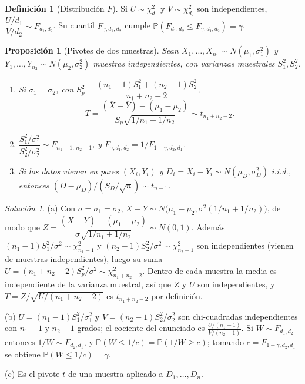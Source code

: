 \documentclass[11pt]{article}
\theoremstyle{plain}
\newtheorem{proposition}[theorem]{Proposición}
\theoremstyle{definition}
\newtheorem{definition}[theorem]{Definición}
\theoremstyle{remark}
\theoremstyle{solstyle}
\newtheorem*{solution}{Solución}
\newcommand{\Pbb}{\mathbb{P}}
\newcommand{\1}{\mathbbm{1}}
\newcommand{\Xbar}{\overline{X}}
\newcommand{\Ybar}{\overline{Y}}
\begin{document}
\begin{definition}[Distribución $F$]
Si $U\sim\chi^2_{d_1}$ y $V\sim\chi^2_{d_2}$ son independientes, $\dfrac{U/d_1}{V/d_2}\sim F_{d_1,d_2}$. Su cuantil $F_{\gamma,d_1,d_2}$ cumple $\Pbb(F_{d_1,d_2}\le F_{\gamma,d_1,d_2})=\gamma$.
\end{definition}

\begin{proposition}[Pivotes de dos muestras]\label{prop:twosample}
Sean $X_1,\dots,X_{n_1}\sim N(\mu_1,\sigma_1^2)$ y $Y_1,\dots,Y_{n_2}\sim N(\mu_2,\sigma_2^2)$ muestras independientes, con varianzas muestrales $S_1^2,S_2^2$.
\begin{enumerate}[label=(\alph*),leftmargin=2em]
\item Si $\sigma_1=\sigma_2$, con $S_p^2=\dfrac{(n_1-1)S_1^2+(n_2-1)S_2^2}{n_1+n_2-2}$,
\[
T=\frac{(\Xbar-\Ybar)-(\mu_1-\mu_2)}{S_p\sqrt{1/n_1+1/n_2}}\sim t_{n_1+n_2-2}.
\]
\item $\dfrac{S_1^2/\sigma_1^2}{S_2^2/\sigma_2^2}\sim F_{n_1-1,\,n_2-1}$, y $F_{\gamma,d_1,d_2}=1/F_{1-\gamma,d_2,d_1}$.
\item Si los datos vienen en pares $(X_i,Y_i)$ y $D_i=X_i-Y_i\sim N(\mu_D,\sigma_D^2)$ i.i.d., entonces $(\overline D-\mu_D)/(S_D/\sqrt n)\sim t_{n-1}$.
\end{enumerate}
\end{proposition}

\begin{solution}
(a) Con $\sigma=\sigma_1=\sigma_2$, $\Xbar-\Ybar\sim N\bigl(\mu_1-\mu_2,\sigma^2(1/n_1+1/n_2)\bigr)$, de modo que $Z=\dfrac{(\Xbar-\Ybar)-(\mu_1-\mu_2)}{\sigma\sqrt{1/n_1+1/n_2}}\sim N(0,1)$. Además $(n_1-1)S_1^2/\sigma^2\sim\chi^2_{n_1-1}$ y $(n_2-1)S_2^2/\sigma^2\sim\chi^2_{n_2-1}$ son independientes (vienen de muestras independientes), luego su suma $U=(n_1+n_2-2)S_p^2/\sigma^2\sim\chi^2_{n_1+n_2-2}$. Dentro de cada muestra la media es independiente de la varianza muestral, así que $Z$ y $U$ son independientes, y $T=Z/\sqrt{U/(n_1+n_2-2)}$ es $t_{n_1+n_2-2}$ por definición.

(b) $U=(n_1-1)S_1^2/\sigma_1^2$ y $V=(n_2-1)S_2^2/\sigma_2^2$ son chi-cuadradas independientes con $n_1-1$ y $n_2-1$ grados; el cociente del enunciado es $\frac{U/(n_1-1)}{V/(n_2-1)}$. Si $W\sim F_{d_1,d_2}$ entonces $1/W\sim F_{d_2,d_1}$, y $\Pbb(W\le 1/c)=\Pbb(1/W\ge c)$; tomando $c=F_{1-\gamma,d_2,d_1}$ se obtiene $\Pbb(W\le 1/c)=\gamma$.

(c) Es el pivote $t$ de una muestra aplicado a $D_1,\dots,D_n$.
\end{solution}
\end{document}
